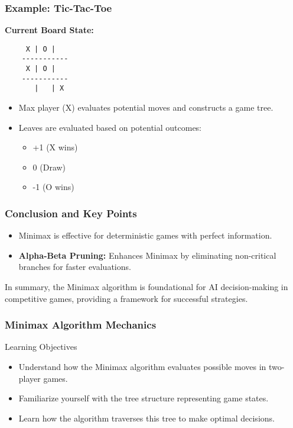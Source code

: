 \documentclass[aspectratio=169]{beamer}
\begin{document}
\begin{frame}[fragile]
    \frametitle{Example: Tic-Tac-Toe}
    \textbf{Current Board State:}
    \begin{verbatim}
     X | O |  
    -----------
     X | O |  
    -----------
       |   | X
    \end{verbatim}
    \begin{itemize}
        \item Max player (X) evaluates potential moves and constructs a game tree.
        \item Leaves are evaluated based on potential outcomes:
            \begin{itemize}
                \item +1 (X wins)
                \item 0 (Draw)
                \item -1 (O wins)
            \end{itemize}
    \end{itemize}
\end{frame}

\begin{frame}[fragile]
    \frametitle{Conclusion and Key Points}
    \begin{itemize}
        \item Minimax is effective for deterministic games with perfect information.
        \item \textbf{Alpha-Beta Pruning:} Enhances Minimax by eliminating non-critical branches for faster evaluations.
    \end{itemize}
    In summary, the Minimax algorithm is foundational for AI decision-making in competitive games, providing a framework for successful strategies.
\end{frame}

\begin{frame}
    \frametitle{Minimax Algorithm Mechanics}
    \begin{block}{Learning Objectives}
        \begin{itemize}
            \item Understand how the Minimax algorithm evaluates possible moves in two-player games.
            \item Familiarize yourself with the tree structure representing game states.
            \item Learn how the algorithm traverses this tree to make optimal decisions.
        \end{itemize}
    \end{block}
\end{frame}
\end{document}
